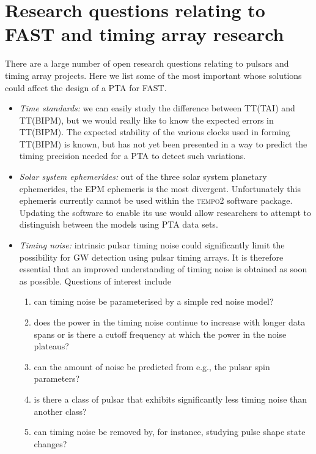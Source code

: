 \documentclass{raa}            %
\begin{document}
\section{Research questions relating to FAST and timing array research}\label{sec:unanswered}

There are a large number of open research questions relating to pulsars and timing array projects.  Here we list some of the most important whose solutions could affect the design of a PTA for FAST.

\begin{itemize}
\item \emph{Time standards:} we can easily study the difference between TT(TAI) and TT(BIPM), but we would really like to know the expected errors in TT(BIPM).  The expected stability of the various clocks used in forming TT(BIPM) is known, but has not yet been presented in a way to predict the timing precision needed for a PTA to detect such variations.

\item \emph{Solar system ephemerides:} out of the three solar system planetary ephemerides, the EPM ephemeris is the most divergent. Unfortunately this ephemeris currently cannot be used within the \textsc{tempo2} software package. Updating the software to enable its use would allow researchers to attempt to distinguish between the models using PTA data sets.

\item \emph{Timing noise:} intrinsic pulsar timing noise could significantly limit the possibility for GW detection using pulsar timing arrays. It is therefore essential that an improved understanding of timing noise is obtained as soon as possible.  Questions of interest include 
 \begin{enumerate}
  \item can timing noise be parameterised by a simple red noise model?
  \item does the power in the timing noise continue to increase with longer data spans or is there a cutoff frequency at which the power in the noise plateaus?
   \item can the amount of noise be predicted from e.g., the pulsar spin parameters?
   \item is there a class of pulsar that exhibits significantly less timing noise than another class?  
   \item can timing noise be removed by, for instance, studying pulse shape state changes? 
  \end{enumerate}
  

\end{itemize}
\end{document}
